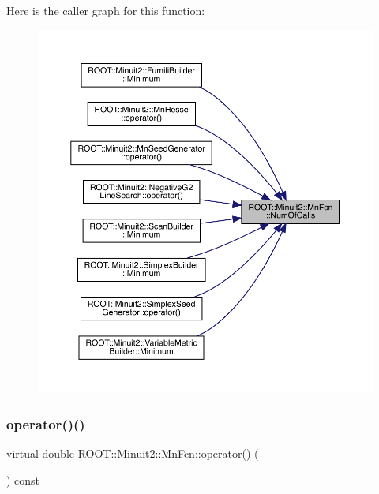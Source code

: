 Here is the caller graph for this function\+:
\nopagebreak
\begin{figure}[H]
\begin{center}
\leavevmode
\includegraphics[width=350pt]{de/d0e/classROOT_1_1Minuit2_1_1MnFcn_af8dc896f10dc8a53429260198cd0e1c5_icgraph}
\end{center}
\end{figure}
\mbox{\label{classROOT_1_1Minuit2_1_1MnFcn_ad981818a8e3bba0ec2cb0300238a5610}} 
\subsubsection{\texorpdfstring{operator()()}{operator()()}\hspace{0.1cm}{\footnotesize\ttfamily [1/3]}}
{\footnotesize\ttfamily virtual double R\+O\+O\+T\+::\+Minuit2\+::\+Mn\+Fcn\+::operator() (\begin{DoxyParamCaption}\item[{const \mbox{\hyperlink{namespaceROOT_1_1Minuit2_a62ed97730a1ca8d3fbaec64a19aa11c9}{Mn\+Algebraic\+Vector}} \&}]{ }\end{DoxyParamCaption}) const\hspace{0.3cm}{\ttfamily [virtual]}}



